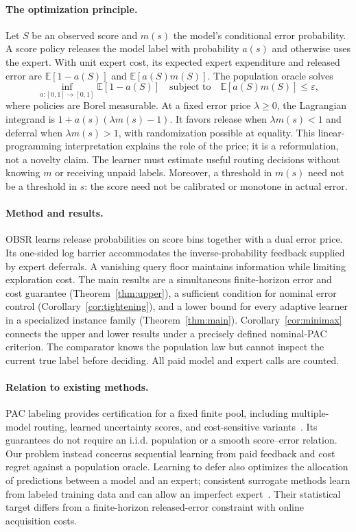 \documentclass[11pt]{article}
\theoremstyle{remark}
\newcommand{\E}{\mathbb E}
\newcommand{\eps}{\varepsilon}
\begin{document}
\paragraph{The optimization principle.}
Let $S$ be an observed score and $m(s)$ the model's conditional error
probability. A score policy releases the model label with probability
$a(s)$ and otherwise uses the expert. With unit expert cost, its
expected expert expenditure and released error are
$\E[1-a(S)]$ and $\E[a(S)m(S)]$. The population oracle solves
\begin{equation}
 \inf_{a:[0,1]\to[0,1]}\E[1-a(S)]
 \quad\text{subject to}\quad
 \E[a(S)m(S)]\le\eps,
 \label{eq:oracle-intro}
\end{equation}
where policies are Borel measurable. At a fixed error price
$\lambda\ge0$, the Lagrangian integrand is
$1+a(s)(\lambda m(s)-1)$. It favors release when $\lambda m(s)<1$
and deferral when $\lambda m(s)>1$, with randomization possible at
equality. This linear-programming interpretation explains the role of
the price; it is a reformulation, not a novelty claim. The learner must
estimate useful routing decisions without knowing $m$ or receiving
unpaid labels. Moreover, a threshold in $m(s)$ need not be a threshold
in $s$: the score need not be calibrated or monotone in actual error.

\paragraph{Method and results.}
OBSR learns release probabilities on score bins together with a dual
error price. Its one-sided log barrier accommodates the
inverse-probability feedback supplied by expert deferrals. A vanishing
query floor maintains information while limiting exploration cost.
The main results are a simultaneous finite-horizon error and cost
guarantee (Theorem~\ref{thm:upper}), a sufficient condition for nominal
error control (Corollary~\ref{cor:tightening}), and a lower bound for
every adaptive learner in a specialized instance family
(Theorem~\ref{thm:main}). Corollary~\ref{cor:minimax} connects the upper
and lower results under a precisely defined nominal-PAC criterion.
The comparator knows the population law but cannot inspect the current
true label before deciding. All paid model and expert calls are counted.

\paragraph{Relation to existing methods.}
PAC labeling provides certification for a fixed finite pool, including
multiple-model routing, learned uncertainty scores, and cost-sensitive
variants~\cite{paclabels}. Its guarantees do not require an i.i.d.
population or a smooth score--error relation. Our problem instead concerns
sequential learning from paid feedback and cost regret against a population
oracle. Learning to defer also optimizes the allocation of predictions
between a model and an expert; consistent surrogate methods learn from
labeled training data and can allow an imperfect expert~\cite{defer}.
Their statistical target differs from a finite-horizon released-error
constraint with online acquisition costs.
\end{document}
